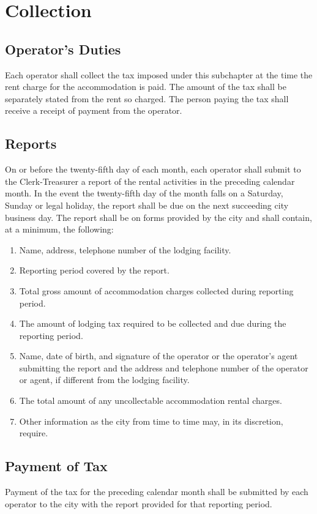 \section{Collection}
\subsection{Operator's Duties}
Each operator shall collect the tax imposed under this subchapter at the time the rent charge for the accommodation is paid. The amount of the tax shall be separately stated from the rent so charged. The person paying the tax shall receive a receipt of payment from the operator.
\subsection{Reports}
On or before the twenty-fifth day of each month, each operator shall submit to the Clerk-Treasurer a report of the rental activities in the preceding calendar month. In the event the twenty-fifth day of the month falls on a Saturday, Sunday or legal holiday, the report shall be due on the next succeeding city business day. The report shall be on forms provided by the city and shall contain, at a minimum, the following:
\begin{enumerate}
    \item Name, address, telephone number of the lodging facility.
    \item Reporting period covered by the report.
    \item Total gross amount of accommodation charges collected during reporting period.
    \item The amount of lodging tax required to be collected and due during the reporting period.
    \item Name, date of birth, and signature of the operator or the operator’s agent submitting the report and the address and telephone number of the operator or agent, if different from the lodging facility.
    \item The total amount of any uncollectable accommodation rental charges.
    \item Other information as the city from time to time may, in its discretion, require.
\end{enumerate}
\subsection{Payment of Tax}
Payment of the tax for the preceding calendar month shall be submitted by each operator to the city with the report provided for that reporting period.

